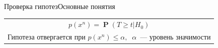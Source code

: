 \documentclass[11pt,pdf,utf8,hyperref={unicode},aspectratio=169]{beamer}
\DeclareMathOperator{\prob}{\mathbf{P}}
\begin{document}
\begin{frame}{Проверка гипотез}{Основные понятия}
    \begin{center}

    \begin{tabular}{ll}
        \multicolumn{2}{c}{ $p\left(x^n\right) = \prob\left(T\geqslant  t\left|H_0\right.\right)$ } \\
        \multicolumn{2}{c}{Гипотеза отвергается при $p\left(x^n\right)\leqslant\alpha,\;\;\alpha$~--- уровень значимости} \\    \end{tabular}
    \end{center}
\end{frame}
\end{document}
